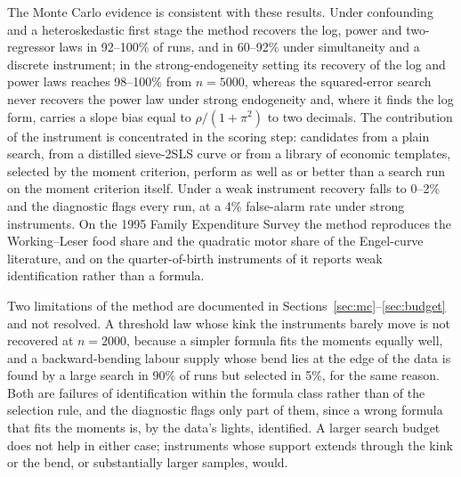 The Monte Carlo evidence is consistent with these results. Under confounding and a heteroskedastic first stage the method recovers the log, power and two-regressor laws in 92--100\% of runs, and in 60--92\% under simultaneity and a discrete instrument; in the strong-endogeneity setting its recovery of the log and power laws reaches 98--100\% from $n = 5000$, whereas the squared-error search never recovers the power law under strong endogeneity and, where it finds the log form, carries a slope bias equal to $\rho/(1 + \pi^2)$ to two decimals. The contribution of the instrument is concentrated in the scoring step: candidates from a plain search, from a distilled sieve-2SLS curve or from a library of economic templates, selected by the moment criterion, perform as well as or better than a search run on the moment criterion itself. Under a weak instrument recovery falls to 0--2\% and the diagnostic flags every run, at a 4\% false-alarm rate under strong instruments. On the 1995 Family Expenditure Survey the method reproduces the Working--Leser food share and the quadratic motor share of the Engel-curve literature, and on the quarter-of-birth instruments of \citet{angristkrueger1991} it reports weak identification rather than a formula.

Two limitations of the method are documented in Sections~\ref{sec:mc}--\ref{sec:budget} and not resolved. A threshold law whose kink the instruments barely move is not recovered at $n = 2000$, because a simpler formula fits the moments equally well, and a backward-bending labour supply whose bend lies at the edge of the data is found by a large search in 90\% of runs but selected in 5\%, for the same reason. Both are failures of identification within the formula class rather than of the selection rule, and the diagnostic flags only part of them, since a wrong formula that fits the moments is, by the data's lights, identified. A larger search budget does not help in either case; instruments whose support extends through the kink or the bend, or substantially larger samples, would.

